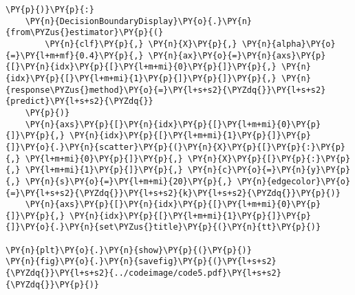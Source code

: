 \begin{Verbatim}[commandchars=\\\{\}]
\PY{p}{)}\PY{p}{:}
    \PY{n}{DecisionBoundaryDisplay}\PY{o}{.}\PY{n}{from\PYZus{}estimator}\PY{p}{(}
        \PY{n}{clf}\PY{p}{,} \PY{n}{X}\PY{p}{,} \PY{n}{alpha}\PY{o}{=}\PY{l+m+mf}{0.4}\PY{p}{,} \PY{n}{ax}\PY{o}{=}\PY{n}{axs}\PY{p}{[}\PY{n}{idx}\PY{p}{[}\PY{l+m+mi}{0}\PY{p}{]}\PY{p}{,} \PY{n}{idx}\PY{p}{[}\PY{l+m+mi}{1}\PY{p}{]}\PY{p}{]}\PY{p}{,} \PY{n}{response\PYZus{}method}\PY{o}{=}\PY{l+s+s2}{\PYZdq{}}\PY{l+s+s2}{predict}\PY{l+s+s2}{\PYZdq{}}
    \PY{p}{)}
    \PY{n}{axs}\PY{p}{[}\PY{n}{idx}\PY{p}{[}\PY{l+m+mi}{0}\PY{p}{]}\PY{p}{,} \PY{n}{idx}\PY{p}{[}\PY{l+m+mi}{1}\PY{p}{]}\PY{p}{]}\PY{o}{.}\PY{n}{scatter}\PY{p}{(}\PY{n}{X}\PY{p}{[}\PY{p}{:}\PY{p}{,} \PY{l+m+mi}{0}\PY{p}{]}\PY{p}{,} \PY{n}{X}\PY{p}{[}\PY{p}{:}\PY{p}{,} \PY{l+m+mi}{1}\PY{p}{]}\PY{p}{,} \PY{n}{c}\PY{o}{=}\PY{n}{y}\PY{p}{,} \PY{n}{s}\PY{o}{=}\PY{l+m+mi}{20}\PY{p}{,} \PY{n}{edgecolor}\PY{o}{=}\PY{l+s+s2}{\PYZdq{}}\PY{l+s+s2}{k}\PY{l+s+s2}{\PYZdq{}}\PY{p}{)}
    \PY{n}{axs}\PY{p}{[}\PY{n}{idx}\PY{p}{[}\PY{l+m+mi}{0}\PY{p}{]}\PY{p}{,} \PY{n}{idx}\PY{p}{[}\PY{l+m+mi}{1}\PY{p}{]}\PY{p}{]}\PY{o}{.}\PY{n}{set\PYZus{}title}\PY{p}{(}\PY{n}{tt}\PY{p}{)}

\PY{n}{plt}\PY{o}{.}\PY{n}{show}\PY{p}{(}\PY{p}{)}
\PY{n}{fig}\PY{o}{.}\PY{n}{savefig}\PY{p}{(}\PY{l+s+s2}{\PYZdq{}}\PY{l+s+s2}{../codeimage/code5.pdf}\PY{l+s+s2}{\PYZdq{}}\PY{p}{)}
\end{Verbatim}
